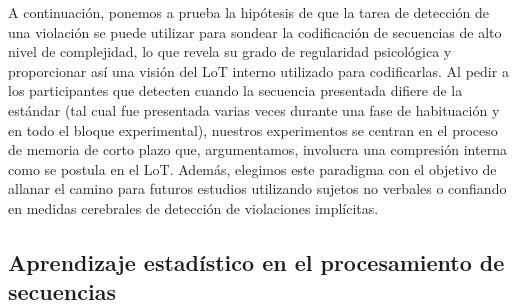 
A continuación, ponemos a prueba la hipótesis de que la tarea de detección de una violación se puede utilizar para sondear la codificación de secuencias de alto nivel de complejidad, lo que revela su grado de regularidad psicológica y proporcionar así una visión del LoT interno utilizado para codificarlas. Al pedir a los participantes que detecten cuando la secuencia presentada difiere de la estándar (tal cual fue presentada varias veces durante una fase de habituación y en todo el bloque experimental), nuestros experimentos se centran en el proceso de memoria de corto plazo que, argumentamos, involucra una compresión interna como se postula en el LoT. Además, elegimos este paradigma con el objetivo de allanar el camino para futuros estudios utilizando sujetos no verbales o confiando en medidas cerebrales de detección de violaciones implícitas.

\subsection{Aprendizaje estadístico en el procesamiento de secuencias}


